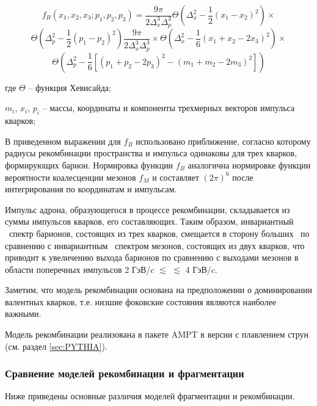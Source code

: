 $$f_B(x_1, x_2, x_3; p_1, p_2, p_3) = \frac{9 \pi}{2\Delta_{x}^3 \Delta_{p}^3} 
\Theta \left( \Delta_{x}^2 - \frac{1}{2} (x_1 - x_2)^2\right) \times $$
$$\Theta \left( \Delta_{p}^2 - \frac{1}{2} (p_1 - p_2)^2\right) \frac{9 \pi}{2\Delta_{x}^3 \Delta_{p}^3}\times
\Theta \left( \Delta_{x}^2 - \frac{1}{6} (x_1 + x_2 - 2 x_3)^2\right) \times $$
$$\Theta \left( \Delta_{p}^2 - \frac{1}{6} \left[ (p_1 + p_2 - 2 p_3)^2 - (m_1 + m_2 -2 m_3)^2 \right] \right) $$

где $\Theta$ -- функция Хевисайда;

$m_i$, $x_i$, $p_i$ -- массы, координаты и компоненты трехмерных векторов импульса кварков;


В приведенном выражении для $f_B$ использовано приближение, согласно которому радиусы рекомбинации пространства и импульса одинаковы для трех кварков, формирующих барион. Нормировка функции $f_B$ аналогична нормировке функции вероятности коалесценции мезонов $f_M$ и составляет $(2\pi)^6$ после интегрирования по координатам и импульсам. 

Импульс адрона, образующегося в процессе рекомбинации, складывается из суммы импульсов кварков, его составляющих. Таким образом, инвариантный \pt \ спектр барионов, состоящих из трех кварков, смещается в сторону больших \pT \ по сравнению с инвариантным \pT \ спектром мезонов, состоящих из двух кварков, что приводит к увеличению выхода барионов по сравнению с выходами мезонов в области поперечных импульсов 2 ГэВ/$c$ $\lesssim$ \pT $\lesssim$ 4 ГэВ/$c$. 

Заметим, что модель рекомбинации основана на предположении о доминировании валентных кварков, т.е. низшие фоковские состояния являются наиболее важными. 

Модель рекомбинации реализована в пакете AMPT в версии с плавлением струн \cite{AMPT} (см. раздел \ref{sec:PYTHIA}). 


\subsubsection{Сравнение моделей рекомбинации и фрагментации}
Ниже приведены основные различия моделей фрагментации и рекомбинации. 

